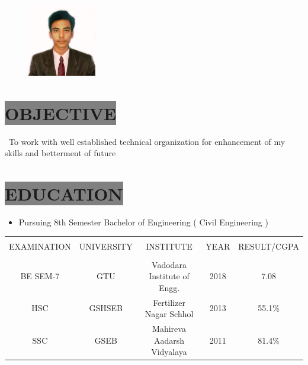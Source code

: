 \documentclass{res}
\begin{document}
 

				             

\address{\bf  ADDRESS\\1136, Himmat lal ni chali\\Opp. Bnak of Baroda\\Po. Bajwa\\Vadodara\\Gujarat-391310\\}
\address{\bf CONTACT \\ \textbf{Mo.} : +91 7874900739 \\  \textbf{E-m@il}: kunalchavda96@gmail.com}


\begin{resume}
\begin{figure}

{\includegraphics[width=3cm]{DSCN4570.JPG}}
\end{figure}



\section{
\colorbox{grey}{OBJECTIVE}
   }   
\ To work with well established technical organization for enhancement of my skills and betterment of future
 
\section{
\colorbox{grey}{EDUCATION}  
}
\begin{itemize}
\item Pursuing 8th Semester Bachelor of Engineering ( Civil Engineering )
\end{itemize}    
    

\begin{table}[ht] 
 \centering%
\begin{tabular}{||c|c|c|c|c||} %
\hline
\hline\\ [.5ex] %
EXAMINATION & UNIVERSITY & INSTITUTE & YEAR & RESULT/CGPA \\ [.5ex] %
\hline
\hline\\ [.5ex]
BE SEM-7 & GTU & Vadodara Institute of Engg. & 2018 & 7.08 \\ [.5ex] %
HSC & GSHSEB & Fertilizer Nagar Schhol & 2013 & 55.1{\%} \\ [.5ex] 
SSC & GSEB & Mahireva Aadarsh Vidyalaya & 2011 & 81.4{\%} \\ [1ex]
\hline %
\end{tabular}
\label{table:lin} %
\end{table}





\end{resume}
\end{document}
